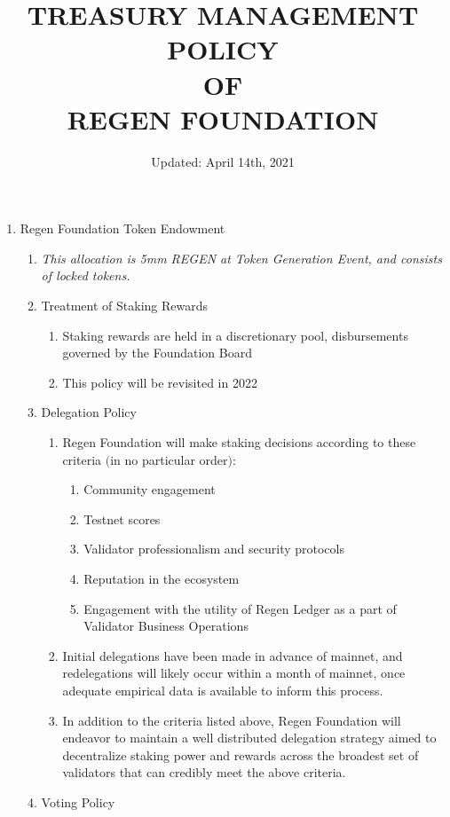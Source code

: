 \documentclass{article}
\begin{document}
\title{TREASURY MANAGEMENT POLICY \protect\\ OF \protect\\ REGEN FOUNDATION}
\author{Updated: April 14th, 2021}
\date{} 
\maketitle
\begin{enumerate}
\item Regen Foundation Token Endowment
\begin{enumerate}
\item {\it This allocation is 5mm REGEN at Token Generation Event, and consists of locked tokens.}
\item Treatment of Staking Rewards
\begin{enumerate}
\item Staking rewards are held in a discretionary pool, disbursements governed by the Foundation Board
\item This policy will be revisited in 2022
\end{enumerate}
\item Delegation Policy
\begin{enumerate}
\item Regen Foundation will make staking decisions according to these criteria $($in no particular order$)$:
\begin{enumerate}
\item Community engagement
\item Testnet scores
\item Validator professionalism and security protocols
\item Reputation in the ecosystem
\item Engagement with the utility of Regen Ledger as a part of Validator Business Operations
\end{enumerate}
\item Initial delegations have been made in advance of mainnet, and redelegations will likely occur within a month of mainnet, once adequate empirical data is available to inform this process.
\item In addition to the criteria listed above, Regen Foundation will endeavor to maintain a well distributed delegation strategy aimed to decentralize staking power and rewards across the broadest set of validators that can credibly meet the above criteria. 
\end{enumerate}
\item Voting Policy
\begin{enumerate}

\end{enumerate}
\end{enumerate}
\end{enumerate}
\end{document}

